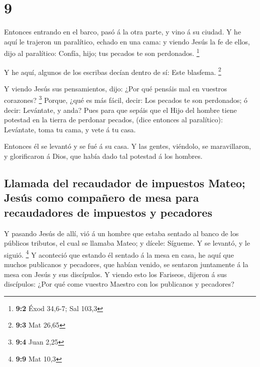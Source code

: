 \hypertarget{section-8}{%
\section{9}\label{section-8}}

 Entonces entrando en el barco, pasó á la otra parte, y
vino á su ciudad.  Y he aquí le trajeron un paralítico,
echado en una cama: y viendo Jesús la fe de ellos, dijo al paralítico:
Confía, hijo; tus pecados te son perdonados. \footnote{\textbf{9:2} Éxod
  34,6-7; Sal 103,3}

 Y he aquí, algunos de los escribas decían dentro de sí:
Este blasfema. \footnote{\textbf{9:3} Mat 26,65}

 Y viendo Jesús sus pensamientos, dijo: ¿Por qué pensáis
mal en vuestros corazones? \footnote{\textbf{9:4} Juan 2,25}
 Porque, ¿qué es más fácil, decir: Los pecados te son
perdonados; ó decir: Levántate, y anda?  Pues para que
sepáis que el Hijo del hombre tiene potestad en la tierra de perdonar
pecados, (dice entonces al paralítico): Levántate, toma tu cama, y vete
á tu casa.

 Entonces él se levantó y se fué á su casa. 
Y las gentes, viéndolo, se maravillaron, y glorificaron á Dios, que
había dado tal potestad á los hombres.

\hypertarget{llamada-del-recaudador-de-impuestos-mateo-jesuxfas-como-compauxf1ero-de-mesa-para-recaudadores-de-impuestos-y-pecadores}{%
\subsection{Llamada del recaudador de impuestos Mateo; Jesús como
compañero de mesa para recaudadores de impuestos y
pecadores}\label{llamada-del-recaudador-de-impuestos-mateo-jesuxfas-como-compauxf1ero-de-mesa-para-recaudadores-de-impuestos-y-pecadores}}

 Y pasando Jesús de allí, vió á un hombre que estaba
sentado al banco de los públicos tributos, el cual se llamaba Mateo; y
dícele: Sígueme. Y se levantó, y le siguió. \footnote{\textbf{9:9} Mat
  10,3}  Y aconteció que estando él sentado á la mesa en
casa, he aquí que muchos publicanos y pecadores, que habían venido, se
sentaron juntamente á la mesa con Jesús y sus discípulos.
 Y viendo esto los Fariseos, dijeron á sus discípulos:
¿Por qué come vuestro Maestro con los publicanos y pecadores?

